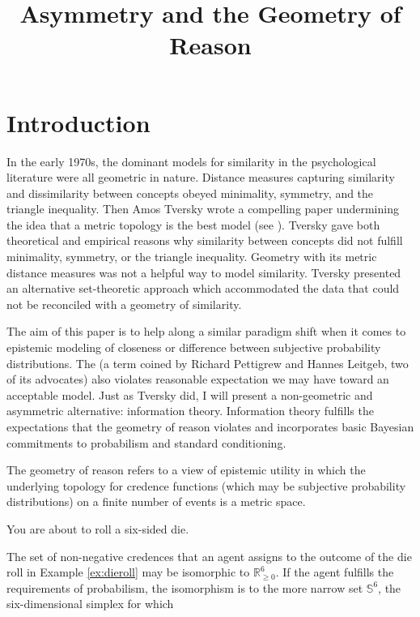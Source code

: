 \documentclass[11pt]{article}
\begin{document}
\title{Asymmetry and the Geometry of Reason}
\date{}
\maketitle

\section{Introduction}
\label{intr}

In the early 1970s, the dominant models for similarity in the
psychological literature were all geometric in nature. Distance
measures capturing similarity and dissimilarity between concepts
obeyed minimality, symmetry, and the triangle inequality. Then Amos
Tversky wrote a compelling paper undermining the idea that a metric
topology is the best model (see ). Tversky gave
both theoretical and empirical reasons why similarity between concepts
did not fulfill minimality, symmetry, or the triangle inequality.
Geometry with its metric distance measures was not a helpful way to
model similarity. Tversky presented an alternative set-theoretic
approach which accommodated the data that could not be reconciled with
a geometry of similarity.

The aim of this paper is to help along a similar paradigm shift when
it comes to epistemic modeling of closeness or difference between
subjective probability distributions. The 
(a term coined by Richard Pettigrew and Hannes Leitgeb, two of its
advocates) also violates reasonable expectation we may have toward an
acceptable model. Just as Tversky did, I will present a non-geometric
and asymmetric alternative: information theory. Information theory
fulfills the expectations that the geometry of reason violates and
incorporates basic Bayesian commitments to probabilism and standard
conditioning.

The geometry of reason refers to a view of epistemic utility in which
the underlying topology for credence functions (which may be
subjective probability distributions) on a finite number of events is
a metric space. 

\begin{quotex}
  \label{ex:dieroll} You are about to roll a
  six-sided die.
\end{quotex}

The set of non-negative credences that an agent assigns to the outcome
of the die roll in Example \ref{ex:dieroll} may be isomorphic to
$\mathbb{R}_{\geq{}0}^{6}$. If the agent fulfills the requirements of
probabilism, the isomorphism is to the more narrow set $\mathbb{S}^6$,
the six-dimensional simplex for which
\end{document}
